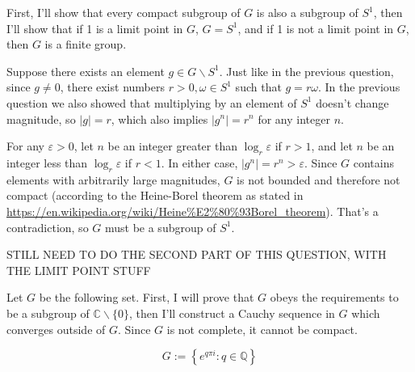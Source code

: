 \documentclass[12pt]{article}
\begin{document}
\bigskip
\noindent{}\bigskip

First, I'll show that every compact subgroup of $G$ is also a subgroup of $S^1$, then I'll show that if 1 is a limit point in $G$, $G=S^1$, and if 1 is not a limit point in $G$, then $G$ is a finite group.
\par
Suppose there exists an element $g \in G \backslash S^1$. Just like in the previous question, since $g \neq 0$, there exist numbers $r>0, \omega \in S^1$ such that $g=r\omega$. In the previous question we also showed that multiplying by an element of $S^1$ doesn't change magnitude, so $|g|=r$, which also implies $|g^n|=r^n$ for any integer $n$.
\par
For any $\varepsilon > 0$, let $n$ be an integer greater than $\log_r \varepsilon$ if $r>1$, and let $n$ be an integer less than $\log_r \varepsilon$ if $r<1$. In either case, $|g^n|=r^n>\varepsilon$. Since $G$ contains elements with arbitrarily large magnitudes, $G$ is not bounded and therefore not compact (according to the Heine-Borel theorem as stated in \url{https://en.wikipedia.org/wiki/Heine%E2%80%93Borel_theorem}). That's a contradiction, so $G$ must be a subgroup of $S^1$.
\par
STILL NEED TO DO THE SECOND PART OF THIS QUESTION, WITH THE LIMIT POINT STUFF

\bigskip
\noindent{}\bigskip

Let $G$ be the following set. First, I will prove that $G$ obeys the requirements to be a subgroup of $\mathbb{C} \backslash \{0\}$, then I'll construct a Cauchy sequence in $G$ which converges outside of $G$. Since $G$ is not complete, it cannot be compact.

\[ G := \left\{ e^{q \pi i} : q \in \mathbb{Q} \right\} \]
\end{document}
